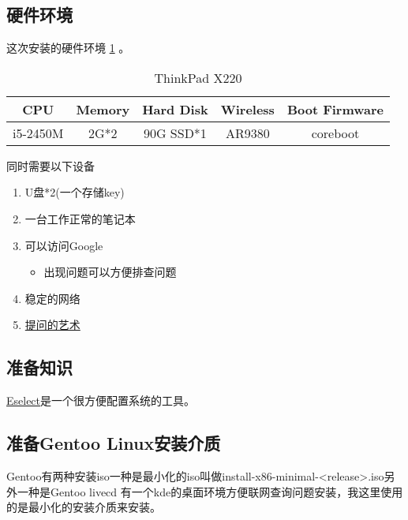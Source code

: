 \subsection{硬件环境}
这次安装的硬件环境 \ref{table:1} 。

\begin{table}[h!]
\centering
\begin{tabular}{||c| c| c| c|c||} 
 \hline
 CPU  & Memory  & Hard Disk & Wireless & Boot Firmware\\ [1ex]

 \hline
 i5-2450M & 2G*2    & 90G SSD*1 & AR9380 & coreboot\\
 \hline
\end{tabular}
\caption{ThinkPad X220 }
\label{table:1}
\end{table}


同时需要以下设备
\begin{enumerate}
\item U盘*2(一个存储key)
\item 一台工作正常的笔记本
\item 可以访问Google
  \begin{itemize}
    \item 出现问题可以方便排查问题
  \end{itemize}
\item 稳定的网络
  \item \href{https://github.com/ryanhanwu/How-To-Ask-Questions-The-Smart-Way/blob/master/README-zh_CN.md}{提问的艺术}
\end{enumerate}



\subsection{准备知识}
\href{https://wiki.gentoo.org/wiki/Eselect}{Eselect}是一个很方便配置系统的工具。

\subsection{准备Gentoo Linux安装介质}
Gentoo有两种安装iso一种是最小化的iso叫做install-x86-minimal-<release>.iso另外一种是Gentoo livecd 有一个kde的桌面环境方便联网查询问题安装，我这里使用的是最小化的安装介质来安装。
